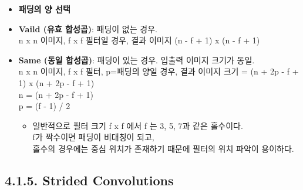 \documentclass[11pt]{article}
\providecommand{\tightlist}{%
      \setlength{\itemsep}{0pt}\setlength{\parskip}{0pt}}
\begin{document}
\begin{itemize}
\tightlist
\item
  \textbf{패딩의 양 선택}
\item
  \textbf{Vaild (유효 합성곱)}: 패딩이 없는 경우.\\
  n x n 이미지, f x f 필터일 경우, 결과 이미지 (n - f + 1) x (n - f + 1)
\item
  \textbf{Same (동일 합성곱)}: 패딩이 있는 경우. 입출력 이미지 크기가
  동일.\\
  n x n 이미지, f x f 필터, p=패딩의 양일 경우, 결과 이미지 크기 = (n +
  2p - f + 1) x (n + 2p - f + 1)\\
  n = (n + 2p - f + 1)\\
  p = (f - 1) / 2

  \begin{itemize}
  \tightlist
  \item
    일반적으로 필터 크기 f x f 에서 f 는 3, 5, 7과 같은 홀수이다.\\
    f가 짝수이면 패딩이 비대칭이 되고,\\
    홀수의 경우에는 중심 위치가 존재하기 때문에 필터의 위치 파악이
    용이하다.
  \end{itemize}
\end{itemize}

 

    \subsection{4.1.5. Strided Convolutions}\label{strided-convolutions}
\end{document}

